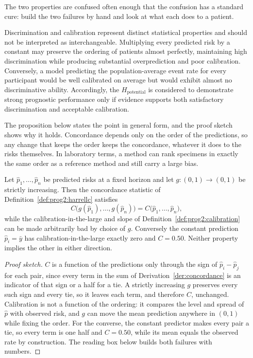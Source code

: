 \noindent The two properties are confused often enough that the confusion has a standard cure: build the two failures by hand and look at what each does to a patient.

Discrimination and calibration represent distinct statistical properties and should not be interpreted as interchangeable. Multiplying every predicted risk by a constant may preserve the ordering of patients almost perfectly, maintaining high discrimination while producing substantial overprediction and poor calibration. Conversely, a model predicting the population-average event rate for every participant would be well calibrated on average but would exhibit almost no discriminative ability. Accordingly, the $H_{\text{potential}}$ is considered to demonstrate strong prognostic performance only if evidence supports both satisfactory discrimination and acceptable calibration.

The proposition below states the point in general form, and the proof sketch shows why it holds. Concordance depends only on the order of the predictions, so any change that keeps the order keeps the concordance, whatever it does to the risks themselves. In laboratory terms, a method can rank specimens in exactly the same order as a reference method and still carry a large bias.

\begin{proposition}
\label{prop:prog2:disccal}
Let $\widehat p_1,\dots,\widehat p_n$ be predicted risks at a fixed horizon and
let $g:(0,1)\to(0,1)$ be strictly increasing. Then the concordance statistic of
Definition~\ref{def:prog2:harrellc} satisfies
\[
  C\bigl(g(\widehat p_1),\dots,g(\widehat p_n)\bigr)
  =C\bigl(\widehat p_1,\dots,\widehat p_n\bigr),
\]
while the calibration-in-the-large and slope of
Definition~\ref{def:prog2:calibration} can be made arbitrarily bad by choice of
$g$. Conversely the constant prediction $\widehat p_i=\bar y$ has
calibration-in-the-large exactly zero and $C=0.50$. Neither property implies
the other in either direction.
\end{proposition}

\begin{proof}[Proof sketch]
$C$ is a function of the predictions only through the sign of
$\widehat p_i-\widehat p_j$ for each pair, since every term in the sum of
Derivation~\ref{der:concordance} is an indicator of that sign or a half for a
tie. A strictly increasing $g$ preserves every such sign and every tie, so it
leaves each term, and therefore $C$, unchanged. Calibration is not a function
of the ordering: it compares the level and spread of $\widehat p$ with observed
risk, and $g$ can move the mean prediction anywhere in $(0,1)$ while fixing the
order. For the converse, the constant predictor makes every pair a tie, so
every term is one half and $C=0.50$, while its mean equals the observed rate by
construction. The reading box below builds both failures with numbers.
\end{proof}

